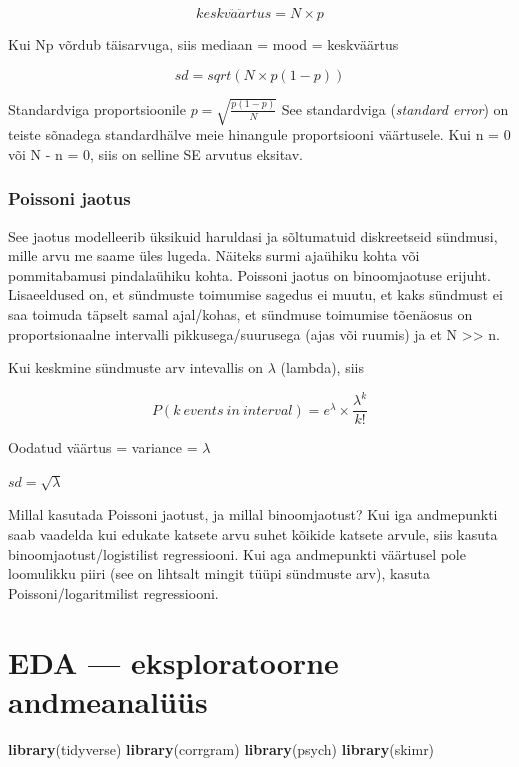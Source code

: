 \documentclass[]{book}
\newenvironment{Shaded}{\begin{snugshade}}{\end{snugshade}}
\newcommand{\KeywordTok}[1]{\textcolor[rgb]{0.13,0.29,0.53}{\textbf{#1}}}
\newcommand{\NormalTok}[1]{#1}
\begin{document}
\[keskv\ddot{a}\ddot{a}rtus = N \times p\]

Kui Np võrdub täisarvuga, siis mediaan = mood = keskväärtus

\[sd = sqrt(N \times p(1 - p))\]

Standardviga proportsioonile \(p = \sqrt{\frac{p(1 - p)}{N}}\)
See standardviga (\emph{standard error}) on teiste sõnadega standardhälve meie hinangule proportsiooni väärtusele.
Kui n = 0 või N - n = 0, siis on selline SE arvutus eksitav.

\hypertarget{poissoni-jaotus}{%
\subsection{Poissoni jaotus}\label{poissoni-jaotus}}

See jaotus modelleerib üksikuid haruldasi ja sõltumatuid diskreetseid sündmusi, mille arvu me saame üles lugeda.
Näiteks surmi ajaühiku kohta või pommitabamusi pindalaühiku kohta. Poissoni jaotus on binoomjaotuse erijuht.
Lisaeeldused on, et sündmuste toimumise sagedus ei muutu, et kaks sündmust ei saa toimuda täpselt samal ajal/kohas, et sündmuse toimumise tõenäosus on proportsionaalne intervalli pikkusega/suurusega (ajas või ruumis) ja et N \textgreater{}\textgreater{} n.

Kui keskmine sündmuste arv intevallis on \(\lambda\) (lambda), siis

\[P(k~events~in~interval) = e^{\lambda} \times \frac{\lambda ^{k}}{k!}\]

Oodatud väärtus = variance = \(\lambda\)

\(sd = \sqrt{\lambda}\)

Millal kasutada Poissoni jaotust, ja millal binoomjaotust? Kui iga andmepunkti saab vaadelda kui edukate katsete arvu suhet kõikide katsete arvule, siis kasuta binoomjaotust/logistilist regressiooni.
Kui aga andmepunkti väärtusel pole loomulikku piiri (see on lihtsalt mingit tüüpi sündmuste arv), kasuta Poissoni/logaritmilist regressiooni.

\hypertarget{eda-eksploratoorne-andmeanaluus}{%
\chapter{EDA --- eksploratoorne andmeanalüüs}\label{eda-eksploratoorne-andmeanaluus}}

\begin{Shaded}
\begin{Highlighting}[]
\KeywordTok{library}\NormalTok{(tidyverse)}
\KeywordTok{library}\NormalTok{(corrgram)}
\KeywordTok{library}\NormalTok{(psych)}
\KeywordTok{library}\NormalTok{(skimr)}
\end{Highlighting}
\end{Shaded}
\end{document}
